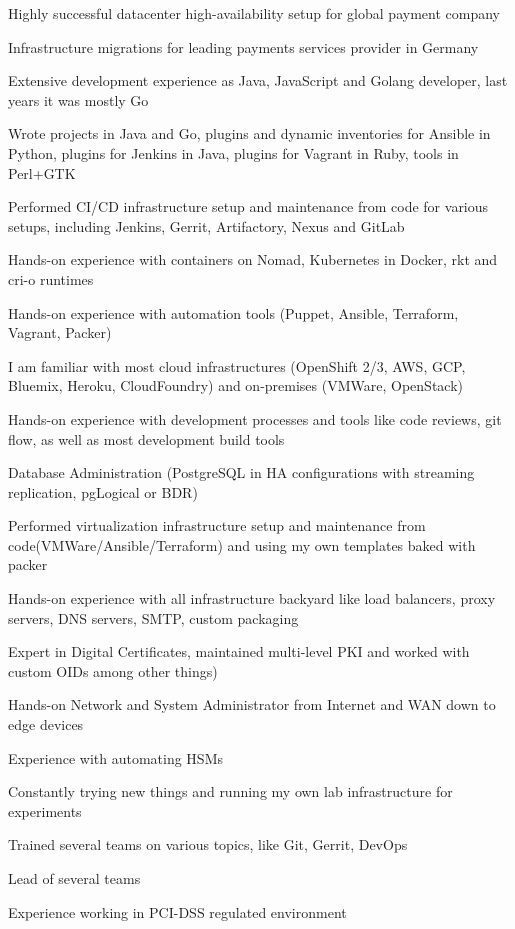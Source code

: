 \documentclass[letterpaper,11pt]{article}
\begin{document}
	Highly successful datacenter high-availability setup for global payment company
	
	Infrastructure migrations for leading payments services provider in Germany
	
	Extensive development experience as Java, JavaScript and Golang developer, last years it was mostly Go
		
	Wrote projects in Java and Go, plugins and dynamic inventories for Ansible in Python, plugins for Jenkins in Java, plugins for Vagrant in Ruby, tools in Perl+GTK
	
	Performed CI/CD infrastructure setup and maintenance from code for various setups, including Jenkins, Gerrit, Artifactory, Nexus and GitLab
	
	Hands-on experience with containers on Nomad, Kubernetes in Docker, rkt and cri-o runtimes
	
	Hands-on experience with automation tools (Puppet, Ansible, Terraform, Vagrant, Packer)
	
	I am familiar with most cloud infrastructures (OpenShift 2/3, AWS, GCP, Bluemix, Heroku, CloudFoundry) and on-premises (VMWare, OpenStack)
	
	Hands-on experience with development processes and tools like code reviews, git flow, as well as most development build tools
	
	Database Administration (PostgreSQL in HA configurations with streaming replication, pgLogical or BDR)
	
	Performed virtualization infrastructure setup and maintenance from code(VMWare/Ansible/Terraform) and using my own templates baked with packer
		
	Hands-on experience with all infrastructure backyard like load balancers, proxy servers, DNS servers, SMTP, custom packaging
	
	Expert in Digital Certificates, maintained multi-level PKI and worked with custom OIDs among other things)
	
	Hands-on Network and System Administrator from Internet and WAN down to edge devices
	
	Experience with automating HSMs

	Constantly trying new things and running my own lab infrastructure for experiments
	
	Trained several teams on various topics, like Git, Gerrit, DevOps
	
	Lead of several teams
	
	Experience working in PCI-DSS regulated environment
	
\end{document}
